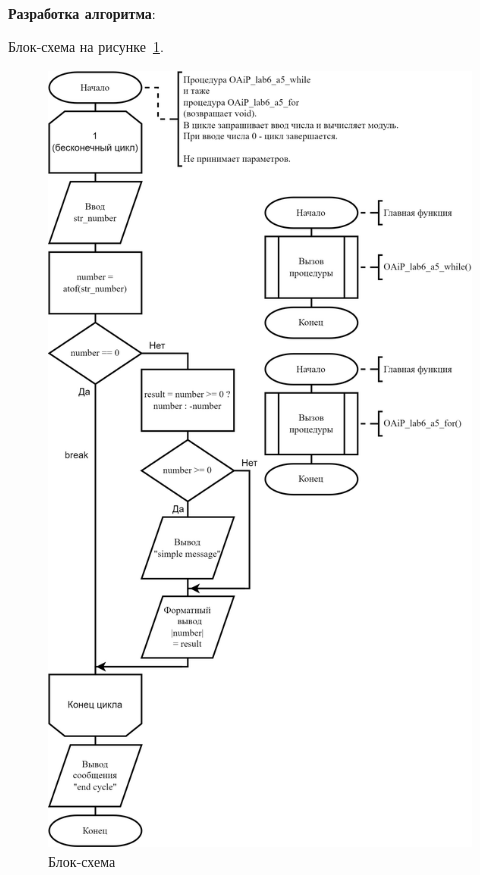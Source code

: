 \documentclass[12pt, a4paper, simple]{eskdtext}
\begin{document}
\paragraph{} \textbf{Разработка алгоритма}:

Блок-схема на рисунке~\ref{fig:a5}.

\begin{figure}[!h]
    \centering
    \includegraphics[]
    {../sources/flowcharts/OAiP_lab6_a5.png}
    \caption{Блок-схема}
    \label{fig:a5}
\end{figure}
\end{document}
